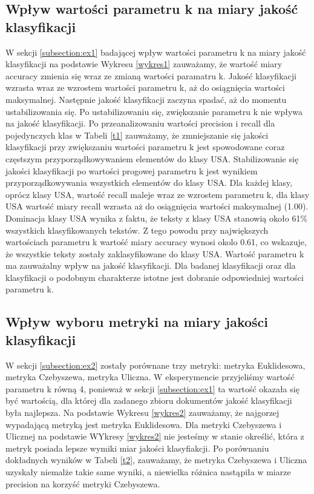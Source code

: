 \documentclass{classrep}
\begin{document}
\subsection{Wpływ wartości parametru k na miary jakość klasyfikacji}
W sekcji \ref{subsection:ex1} badającej wpływ wartości parametru k na miary jakość klasyfikacji na podstawie Wykresu \ref{wykres1} zauważamy, że wartość miary accuracy zmienia się wraz ze zmianą wartości paramatru k. Jakość klasyfikacji wzrasta wraz ze wzrostem wartości parametru k, aż do osiągnięcia wartości maksymalnej. Następnie jakość klasyfikacji zaczyna spadać, aż do momentu ustabilizowania się. Po ustabilizowaniu się, zwiększanie parametru k nie wpływa na jakość klasyfikacji. Po przeanalizowaniu wartości precision i recall dla pojedynczych klas w Tabeli \ref{t1} zauważamy, że zmniejszanie się jakości klasyfikacji przy zwiększaniu wartości parametru k jest spowodowane coraz częstszym przyporządkowywaniem elementów do klasy USA. Stabilizowanie się jakości klasyfikacji po wartości progowej parametru k jest wynikiem przyporządkowywania wszystkich elementów do klasy USA. Dla każdej klasy, oprócz klasy USA, wartość recall maleje wraz ze wzrostem parametru k, dla klasy USA wartość miary recall wzrasta aż do osiągnięcia wartości maksymalnej (1.00). Dominacja klasy USA wynika z faktu, że teksty z klasy USA stanowią około 61\% wszystkich klasyfikowanych tekstów. Z tego powodu przy największych wartościach parametru k wartość miary accuracy wynosi okolo 0.61, co wskazuje, że wszystkie teksty zostały zaklasyfikowane do klasy USA. Wartość parametru k ma zauważalny wpływ na jakość klasyfikacji. Dla badanej klasyfikacji oraz dla klasyfikacji o podobnym charakterze istotne jest dobranie odpowiedniej wartości parametru k.

\subsection{Wpływ wyboru metryki na miary jakości klasyfikacji}
W sekcji \ref{subsection:ex2} zostały porównane trzy metryki: metryka Euklidesowa, metryka Czebyszewa, metryka Uliczna. W eksperymencie przyjeliśmy wartość parametru k równą 4, ponieważ w sekcji \ref{subsection:ex1}  ta wartość okazała się być wartością, dla której dla zadanego zbioru dokumentów jakość klasyfikacji była najlepsza. Na podstawie Wykresu \ref{wykres2} zauważamy, że najgorzej wypadającą metryką jest metryka Euklidesowa. Dla metryki Czebyszewa i Ulicznej na podstawie WYkresy \ref{wykres2} nie jesteśmy w stanie określić, która z metryk posiada lepsze wymiki miar jakości klasyfiakcji. Po porównaniu dokładnych wyników w Tabeli \ref{t2}, zauważamy, że metryka Czebyszewa i Uliczna uzyskały niemalże takie same wyniki, a niewielka różnica nastąpiła w miarze precision na korzyść metryki Czebyszewa. 
\end{document}
